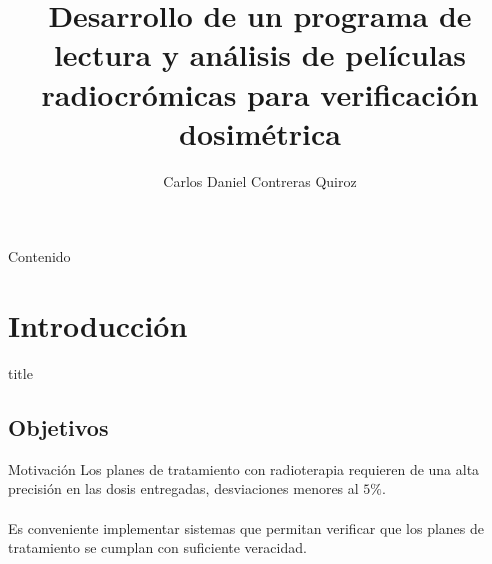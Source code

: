 \documentclass[12pt]{beamer}
\begin{document}
	\author{Carlos Daniel Contreras Quiroz}
	\title{Desarrollo de un programa de lectura y análisis de películas radiocrómicas para verificación dosimétrica}
	\begin{frame}[plain]
	\maketitle
\end{frame}

\begin{frame}{Contenido}
\tableofcontents
\end{frame}

\section{Introducción}
\begin{frame}
\vfill
\centering
\begin{beamercolorbox}[sep=8pt,center,shadow=true,rounded=true]{title}
	\insertsectionhead\par%
\end{beamercolorbox}
\vfill
\end{frame}
\subsection{Objetivos}

\begin{frame}{Motivación}
Los planes de tratamiento con radioterapia requieren de una alta precisión en las dosis entregadas, desviaciones menores al $5\%$.  \\~\\

Es conveniente implementar sistemas que permitan verificar que los planes de tratamiento se cumplan con suficiente veracidad.

\end{frame}
\end{document}
